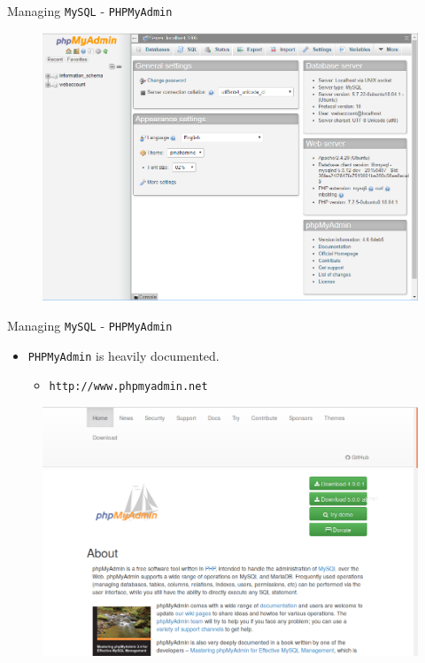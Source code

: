 \documentclass[xcolor=table]{beamer}
\begin{document}
\begin{frame}{Managing \texttt{MySQL} - \texttt{PHPMyAdmin}}
  \begin{figure}
    \begin{center}
      \includegraphics[width=0.9\linewidth]{Accounts3.png}
    \end{center}
  \end{figure}
\end{frame}

\begin{frame}{Managing \texttt{MySQL} - \texttt{PHPMyAdmin}}
  \begin{itemize}
    \item \texttt{PHPMyAdmin} is heavily documented.
    \begin{itemize}
      \item \texttt{http://www.phpmyadmin.net}
    \end{itemize}
  \end{itemize}
  \begin{figure}
    \begin{center}
      \includegraphics[width=0.7\linewidth]{PHPMyAdminSite.png}
    \end{center}
  \end{figure}
\end{frame}
\end{document}
